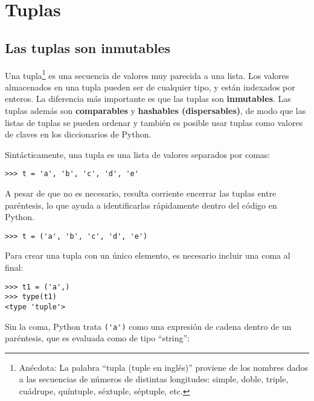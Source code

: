 
\chapter{Tuplas}
\label{tuplechap}

\section{Las tuplas son inmutables}


Una tupla\footnote{Anécdota: La palabra ``tupla (tuple en inglés)'' proviene de los nombres
dados a las secuencias de números de distintas longitudes: simple,
doble, triple, cuádrupe, quíntuple, séxtuple, séptuple, etc.}
es una secuencia de valores muy parecida a una lista.
Los valores almacenados en una tupla pueden ser de cualquier tipo, y
están indexados por enteros.
La diferencia más importante es que las tuplas son {\bf inmutables}.
Las tuplas además son {\bf comparables} y {\bf hashables (dispersables)}, de modo que
las listas de tuplas se pueden ordenar y también es posible usar tuplas
como valores de claves en los diccionarios de Python.


Sintácticamente, una tupla es una lista de valores separados por comas:

\beforeverb
\begin{verbatim}
>>> t = 'a', 'b', 'c', 'd', 'e'
\end{verbatim}
\afterverb
%
A pesar de que no es necesario, resulta corriente encerrar las tuplas entre
paréntesis, lo que ayuda a identificarlas rápidamente dentro del
código en Python.


\beforeverb
\begin{verbatim}
>>> t = ('a', 'b', 'c', 'd', 'e')
\end{verbatim}
\afterverb
%
Para crear una tupla con un único elemento, es necesario incluir una coma
al final:


\beforeverb
\begin{verbatim}
>>> t1 = ('a',)
>>> type(t1)
<type 'tuple'>
\end{verbatim}
\afterverb
%
Sin la coma, Python trata \verb"('a')" como una expresión
de cadena dentro de un paréntesis, que es evaluada como de tipo ``string'':

